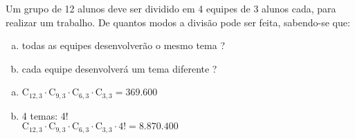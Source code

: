 \begin{ex}
 Um grupo de 12 alunos deve ser dividido em 4 equipes de 3 alunos cada, para realizar um trabalho. De quantos modos a divisão pode ser feita, sabendo-se que:
    \begin{enumerate}[(a)]
    \item todas as equipes desenvolverão o mesmo tema ?
    \item cada equipe desenvolverá um tema diferente ?
    \end{enumerate}
      \begin{sol}
      \phantom{A}  
        \begin{enumerate} [(a)]
            \item $\mathrm{C}_{{12},3}\cdot\mathrm{C}_{9,3}\cdot\mathrm{C}_{6,3}\cdot\mathrm{C}_{3,3}=369.600$
            \item 4 temas: 4!\\   $\mathrm{C}_{{12},3}\cdot\mathrm{C}_{9,3}\cdot\mathrm{C}_{6,3}\cdot\mathrm{C}_{3,3}\cdot 4!=8.870.400$
        \end{enumerate}
      \end{sol}
\end{ex}
